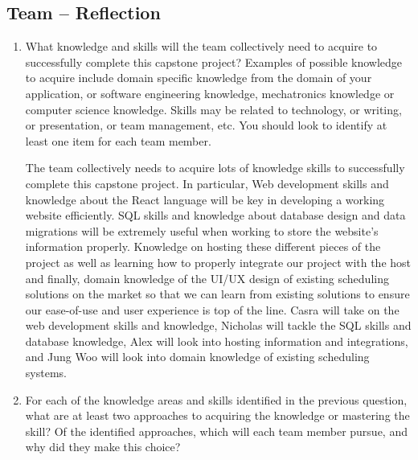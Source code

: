 \documentclass[12pt]{article}
\begin{document}
\subsection*{Team -- Reflection}

\begin{enumerate}
  \item What knowledge and skills will the team collectively need to acquire to
  successfully complete this capstone project?  Examples of possible knowledge
  to acquire include domain specific knowledge from the domain of your
  application, or software engineering knowledge, mechatronics knowledge or
  computer science knowledge.  Skills may be related to technology, or writing,
  or presentation, or team management, etc.  You should look to identify at
  least one item for each team member.

  The team collectively needs to acquire lots of knowledge skills to successfully 
  complete this capstone project. In particular, Web development skills and knowledge 
  about the React language  will be key in developing a working website efficiently. SQL 
  skills and knowledge about database design and data migrations will be extremely useful 
  when working to store the website’s information properly. Knowledge on hosting these 
  different pieces of the project as well as learning how to properly integrate our project 
  with the host and finally, domain knowledge of the UI/UX design of existing scheduling 
  solutions on the market so that we can learn from existing solutions to ensure our 
  ease-of-use and user experience is top of the line. Casra will take on the web development 
  skills and knowledge, Nicholas will tackle the SQL skills and database knowledge, 
  Alex will look into hosting information and integrations, and Jung Woo will look into 
  domain knowledge of existing scheduling systems.

  \item For each of the knowledge areas and skills identified in the previous
  question, what are at least two approaches to acquiring the knowledge or
  mastering the skill?  Of the identified approaches, which will each team
  member pursue, and why did they make this choice?


\end{enumerate}
\end{document}
